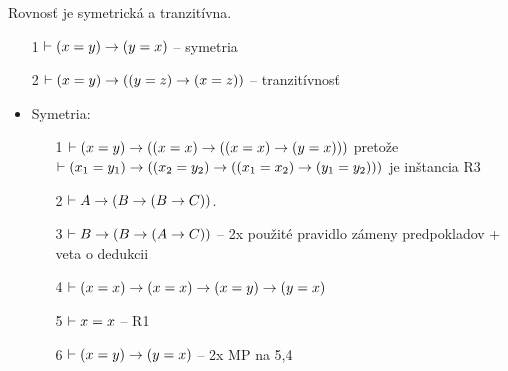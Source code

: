 \begin{lema}
Rovnosť je symetrická a tranzitívna.
    \begin{itemize}
        \item[1] $\vdash (x=y) \rightarrow (y=x)$ -- symetria
        \item[2] $\vdash (x=y) \rightarrow ((y=z) \rightarrow (x=z))$ --
            tranzitívnosť
    \end{itemize}
\end{lema}
\begin{dokaz}
\noindent
\begin{itemize}
    \item Symetria:
        \begin{itemize}
        \item[1] $\vdash (x=y) \rightarrow ((x=x) \rightarrow ((x=x)
                \rightarrow (y=x)))$
            pretože \\
                $\vdash (x_1=y_1) \rightarrow ((x_2=y_2) \rightarrow
                    ((x_1=x_2) \rightarrow (y_1=y_2)))$ je inštancia R3
        \item[2] $\vdash A \rightarrow (B \rightarrow (B \rightarrow C))$.
        \item[3] $\vdash B \rightarrow (B \rightarrow (A \rightarrow C))$ --
            2x použité pravidlo zámeny predpokladov + veta o dedukcii
        \item[4] $\vdash (x=x) \rightarrow (x=x) \rightarrow (x=y)
                    \rightarrow (y=x)$
        \item[5] $\vdash x=x$ -- R1
        \item[6] $\vdash (x=y) \rightarrow (y=x)$ -- 2x MP na 5,4
        \end{itemize}


\end{itemize}
\end{dokaz}
